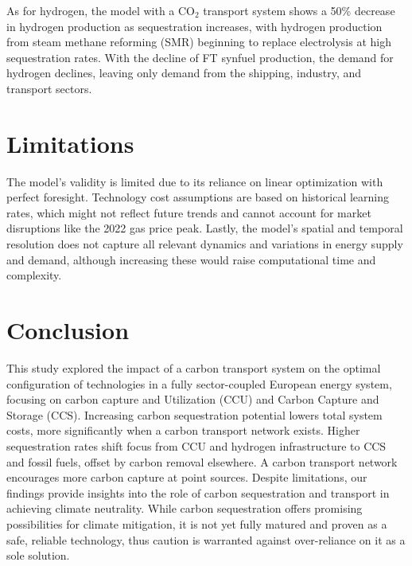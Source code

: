 \documentclass[twocolumn]{article}
\newcommand{\carbon}{CO$_2$}
\begin{document}
As for hydrogen, the model with a \carbon{} transport system shows a 50\% decrease in hydrogen production as sequestration increases, with hydrogen production from steam methane reforming (SMR) beginning to replace electrolysis at high sequestration rates. With the decline of FT synfuel production, the demand for hydrogen declines, leaving only demand from the shipping, industry, and transport sectors.


\section{Limitations}
\label{sec:limitations}


The model's validity is limited due to its reliance on linear optimization with perfect foresight. Technology cost assumptions are based on historical learning rates, which might not reflect future trends and cannot account for market disruptions like the 2022 gas price peak. Lastly, the model's spatial and temporal resolution does not capture all relevant dynamics and variations in energy supply and demand, although increasing these would raise computational time and complexity.

\section{Conclusion}
\label{sec:conclusion}

This study explored the impact of a carbon transport system on the optimal configuration of technologies in a fully sector-coupled European energy system, focusing on carbon capture and Utilization (CCU) and Carbon Capture and Storage (CCS). Increasing carbon sequestration potential lowers total system costs, more significantly when a carbon transport network exists. Higher sequestration rates shift focus from CCU and hydrogen infrastructure to CCS and fossil fuels, offset by carbon removal elsewhere. A carbon transport network encourages more carbon capture at point sources. Despite limitations, our findings provide insights into the role of carbon sequestration and transport in achieving climate neutrality.
While carbon sequestration offers promising possibilities for climate mitigation, it is not yet fully matured and proven as a safe, reliable technology, thus caution is warranted against over-reliance on it as a sole solution.


\printbibliography


\end{document}
